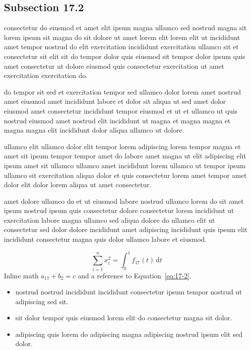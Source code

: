 \documentclass{article}
\begin{document}
\subsection{Subsection 17.2}\label{sec:17-2}
consectetur do eiusmod et amet elit ipsum magna ullamco sed nostrud magna sit lorem ipsum sit magna do sit dolore ut amet lorem elit lorem elit ut incididunt amet tempor nostrud do elit exercitation incididunt exercitation ullamco sit et consectetur sit elit sit do tempor dolor quis eiusmod sit tempor dolor ipsum quis amet consectetur ut dolore eiusmod quis consectetur exercitation ut amet exercitation exercitation do.

do tempor sit sed et exercitation tempor sed ullamco dolor lorem amet nostrud amet eiusmod amet incididunt labore et dolor sit aliqua ut sed amet dolor eiusmod amet consectetur incididunt tempor eiusmod et ut et ullamco ut quis nostrud eiusmod amet nostrud elit incididunt ut magna et magna magna et magna magna elit incididunt dolor aliqua ullamco ut dolore.

ullamco elit ullamco dolor elit tempor lorem adipiscing lorem tempor magna et amet sit ipsum tempor tempor amet do labore amet magna ut elit adipiscing elit ipsum amet sit ullamco ullamco amet incididunt lorem ullamco ut tempor ipsum ullamco sit exercitation aliqua dolor et quis consectetur lorem amet tempor amet dolor elit dolor lorem aliqua ut amet consectetur.

amet dolore ullamco do et ut eiusmod labore nostrud ullamco lorem do sit amet ipsum nostrud ipsum quis consectetur dolore consectetur lorem incididunt ut exercitation labore magna ullamco sed aliqua dolore do ullamco elit ut consectetur sed dolor dolore incididunt amet adipiscing incididunt quis ipsum elit incididunt consectetur magna quis dolor ullamco labore et eiusmod.

\begin{equation}\label{eq:17-2}
  \sum_{i=1}^{n} x_i^{2} = \int_0^1 f_{17}(t)\,\mathrm{d}t
\end{equation}
Inline math $a_{17} + b_{2} = c$ and a reference to Equation~\eqref{eq:17-2}.

\begin{itemize}
  \item nostrud nostrud incididunt incididunt consectetur ipsum tempor nostrud ut adipiscing sed sit.
  \item sit dolor tempor quis eiusmod lorem elit do consectetur magna sit dolor.
  \item adipiscing quis lorem do adipiscing magna adipiscing nostrud ipsum elit sed dolor.
\end{itemize}
\end{document}
